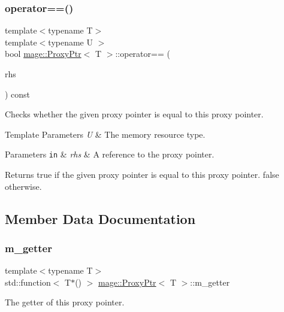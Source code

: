 \subsubsection{\texorpdfstring{operator==()}{operator==()}}
{\footnotesize\ttfamily template$<$typename T$>$ \\
template$<$typename U $>$ \\
bool \hyperlink{classmage_1_1_proxy_ptr}{mage\+::\+Proxy\+Ptr}$<$ T $>$\+::operator== (\begin{DoxyParamCaption}\item[{const \hyperlink{classmage_1_1_proxy_ptr}{Proxy\+Ptr}$<$ U $>$ \&}]{rhs }\end{DoxyParamCaption}) const\hspace{0.3cm}{\ttfamily [noexcept]}}

Checks whether the given proxy pointer is equal to this proxy pointer.


\begin{DoxyTemplParams}{Template Parameters}
{\em U} & The memory resource type. \\
\hline
\end{DoxyTemplParams}

\begin{DoxyParams}[1]{Parameters}
\mbox{\tt in}  & {\em rhs} & A reference to the proxy pointer. \\
\hline
\end{DoxyParams}
\begin{DoxyReturn}{Returns}
{\ttfamily true} if the given proxy pointer is equal to this proxy pointer. {\ttfamily false} otherwise. 
\end{DoxyReturn}


\subsection{Member Data Documentation}
\hypertarget{classmage_1_1_proxy_ptr_a78fad290d478eb55285d4ab01cda1669}{}\label{classmage_1_1_proxy_ptr_a78fad290d478eb55285d4ab01cda1669} 
\subsubsection{\texorpdfstring{m\+\_\+getter}{m\_getter}}
{\footnotesize\ttfamily template$<$typename T$>$ \\
std\+::function$<$ T$\ast$() $>$ \hyperlink{classmage_1_1_proxy_ptr}{mage\+::\+Proxy\+Ptr}$<$ T $>$\+::m\+\_\+getter}

The getter of this proxy pointer. 